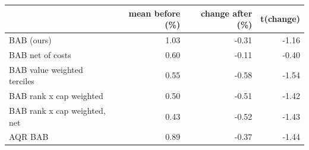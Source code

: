 \begin{tabular}{lrrr}
\toprule
 & mean before (\%) & change after (\%) & t(change) \\
\midrule
BAB (ours) & 1.03 & -0.31 & -1.16 \\
BAB net of costs & 0.60 & -0.11 & -0.40 \\
BAB value weighted terciles & 0.55 & -0.58 & -1.54 \\
BAB rank x cap weighted & 0.50 & -0.51 & -1.42 \\
BAB rank x cap weighted, net & 0.43 & -0.52 & -1.43 \\
AQR BAB & 0.89 & -0.37 & -1.44 \\
\bottomrule
\end{tabular}
